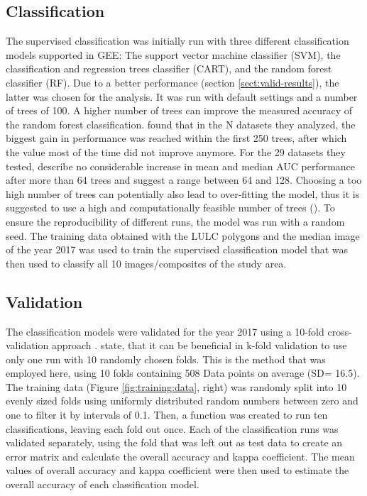 \documentclass[11pt, A4, oneside]{report}
\begin{document}
\subsection{Classification}
The supervised classification was initially run with three different classification models supported in GEE: The support vector machine classifier (SVM), the classification and regression trees classifier (CART), and the random forest classifier (RF). Due to a better performance (section \ref{sect:valid-results}), the latter was chosen for the analysis. It was run with default settings and a number of trees of 100. A higher number of trees can improve the measured accuracy of the random forest classification. \citet{Probst.2017} found that in the N datasets they analyzed, the biggest gain in performance was reached within the first 250 trees, after which the value most of the time did not improve anymore. For the 29 datasets they tested, \citet{Oshiro.2012} describe no considerable increase in mean and median AUC performance after more than 64 trees and suggest a range between 64 and 128. Choosing a too high number of trees can potentially also lead to over-fitting the model, thus it is suggested to use a high and computationally feasible number of trees (\cite{Probst.2017, Oshiro.2012}). To ensure the reproducibility of different runs, the model was run with a random seed. The training data obtained with the LULC polygons and the median image of the year 2017 was used to train the supervised classification model that was then used to classify all 10 images/composites of the study area. 

\subsection{Validation}\label{sect:classi-10fold}
The classification models were validated for the year 2017 using a 10-fold cross-validation approach \parencite{Rodriguez.2010}. \citet{Wong.2020} state, that it can be beneficial in k-fold validation to use only one run with 10 randomly chosen folds. This is the method that was employed here, using 10 folds containing 508 Data points on average (SD= 16.5).
The training data (Figure \ref{fig:training:data}, right) was randomly split into 10 evenly sized folds using uniformly distributed random numbers between zero and one to filter it by intervals of 0.1. Then, a function was created to run ten classifications, leaving each fold out once. Each of the classification runs was validated separately, using the fold that was left out as test data to create an error matrix and calculate the overall accuracy and kappa coefficient. The mean values of overall accuracy and kappa coefficient were then used to estimate the overall accuracy of each classification model.
\end{document}
